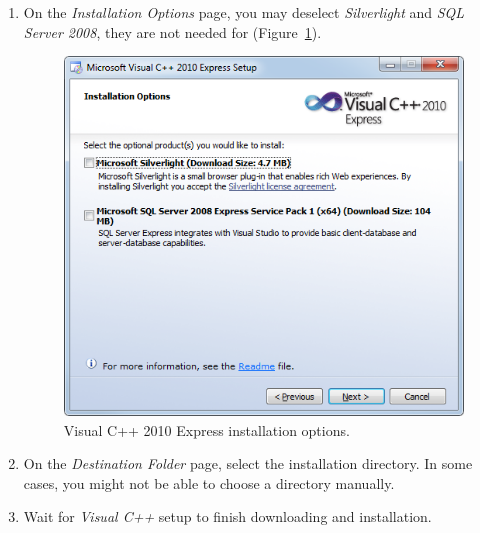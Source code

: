 \begin{enumerate}
	\item On the \emph{Installation Options} page, you may deselect \emph{Silverlight} and \emph{SQL Server 2008}, they are not needed for \xme (Figure~\ref{fig:setup_vs_optional}).

\begin{figure}[htbp]
	\centering
	\includegraphics[scale=0.75]{figures/PNG/setup_vs_optional.png}
	\caption{Visual C++ 2010 Express installation options.}
	\label{fig:setup_vs_optional}
\end{figure}

	\item On the \emph{Destination Folder} page, select the installation directory.
		In some cases, you might not be able to choose a directory manually. %


	\item Wait for \emph{Visual C++} setup to finish downloading and installation. %



\end{enumerate}
